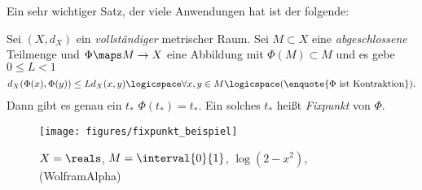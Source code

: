 Ein sehr wichtiger Satz, der viele Anwendungen hat ist der folgende:
\begin{satz}
    Sei \( (X,d_X)\) ein \emph{vollständiger} metrischer Raum. Sei \( M\subset X\) eine \emph{abgeschlossene} Teilmenge und \( \Phi\maps M\to X\) eine Abbildung mit \( \Phi(M)\subset M\) und es gebe \( 0\leq L<1\) \sd
    \begin{align*}
        d_X(\Phi(x),\Phi(y))\leq L d_X(x,y)\logicspace\forall x,y\in M\logicspace (\text{\enquote{\( \Phi\) ist Kontraktion}}).
    \end{align*}
    Dann gibt es genau ein \( t_*\) \sd \( \Phi(t_*)=t_*\). Ein solches \( t_*\) heißt \emph{Fixpunkt} von \( \Phi\). 
\end{satz}
\begin{beispiel*}
    \begin{figure}[H]
        \centering
        \texttt{[image: figures/fixpunkt\_beispiel]}
        \caption*{\( X=\reals \), \( M=\interval{0}{1} \), \( \log(2-x^2)\), (WolframAlpha)}
        \label{fig:fixpunkt_beispiel}
    \end{figure}
\end{beispiel*}
